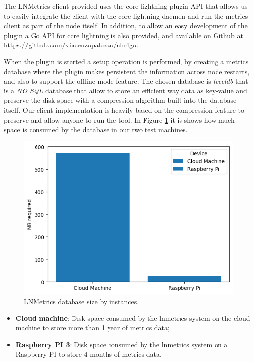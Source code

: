 The LNMetrics client provided uses the core lightning plugin API
that allows us to easily integrate the client with the core lightning daemon 
and run the metrics client as part of the node itself. 
In addition, to allow an easy development of the plugin a 
Go API for core lightning is also provided, and available on 
Github at \url{https://github.com/vincenzopalazzo/cln4go}.

When the plugin is started a setup operation is performed, by creating a 
metrics database where the plugin makes persistent the information 
across node restarts, and also to support the offline mode feature. 
The chosen database is \emph{leveldb} that is a \emph{NO SQL} database 
that allow to store an efficient way data as key-value and preserve
the disk space with a compression algorithm built into the database itself.
Our client implementation is heavily based on the 
compression feature to preserve and allow anyone to 
run the tool. 
In Figure \ref{fig:lnmetrics_diskspace} it is shows how much space is 
consumed by the database in our two test machines. 

\begin{figure}
    \begin{center}
    \includegraphics[scale=0.7]{imgs/disk_space_servers.png}
    \end{center}
    \caption{LNMetrics database size by instances.}
    \label{fig:lnmetrics_diskspace}
\end{figure}

\begin{itemize}
    \item {\bf Cloud machine}: Disk space consumed by the lnmetrics 
        system on the cloud machine to store more than 1 year of metrics data;
    \item {\bf Raspberry PI 3}: Disk space consumed by the lnmetrics system
        on a Raspberry PI to store 4 months of metrics data.
\end{itemize}

